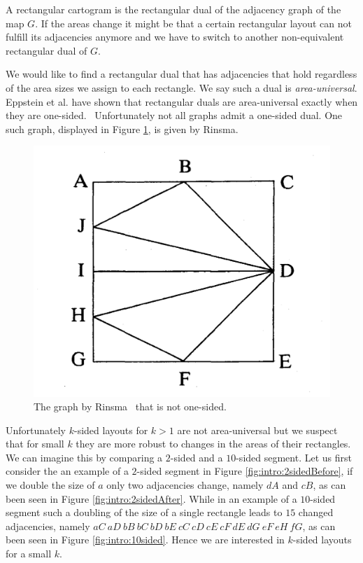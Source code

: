   A rectangular cartogram is the rectangular dual of the adjacency graph of the map $G$.
  If the areas change it might be that a certain rectangular layout can not fulfill its adjacencies anymore and we have to switch to another non-equivalent rectangular dual of $G$.

  We would like to find a rectangular dual that has adjacencies that hold regardless of the area sizes we assign to each rectangle. We say such a dual is \emph{area-universal}.
  Eppstein et al. have shown that rectangular duals are area-universal exactly when they are one-sided.~\cite{Eppstein2012} Unfortunately not all graphs admit a one-sided dual. One such graph, displayed in Figure \ref{fig:intro:rinsma},  is given by Rinsma.~\cite{Rinsma1987}

  \begin{figure}[!t]
    \centering
    \includegraphics[scale=.15]{introduction/img/rinsma.png}
    \caption{The graph by Rinsma~\cite{Rinsma1987} that is not one-sided.}
    \label{fig:intro:rinsma}
  \end{figure}

  Unfortunately $k$-sided layouts for $k>1$ are not area-universal but we suspect that for small $k$ they are more robust to changes in the areas of their rectangles.
  We can imagine this by comparing a $2$-sided and a $10$-sided segment. Let us first consider the an example of a $2$-sided segment in Figure \ref{fig:intro:2sidedBefore},  if we double the size of $a$ only two adjacencies change, namely $dA$ and $cB$, as can been seen in Figure \ref{fig:intro:2sidedAfter}.
  While in an example of a $10$-sided segment such a doubling of the size of a single rectangle leads to $15$ changed adjacencies, namely $aC\ aD\ bB\ bC\ bD\ bE\ cC\ cD\ cE\ cF\ dE\ dG\ eF\ eH\ fG$, as can been seen in Figure \ref{fig:intro:10sided}. Hence we are interested in $k$-sided layouts for a small $k$.

